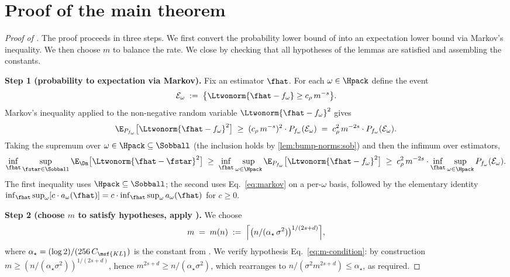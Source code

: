 \section{Proof of the main theorem}\label{sec:proof-of-thm}

\begin{proof}[Proof of ]
The proof proceeds in three steps. We first convert the probability lower bound of  into an expectation lower bound via Markov's inequality. We then choose $m$ to balance the rate. We close by checking that all hypotheses of the lemmas are satisfied and assembling the constants.

\smallskip\noindent\textbf{Step 1 (probability to expectation via Markov).}
Fix an estimator $\fhat$. For each $\omega \in \Hpack$ define the event
\begin{align*}
\mathcal{E}_\omega \;:=\; \bigl\{ \Ltwonorm{\fhat - f_\omega} \geq c_\rho \, m^{-s} \bigr\}.
\end{align*}
Markov's inequality applied to the non-negative random variable $\Ltwonorm{\fhat - f_\omega}^2$ gives
\begin{align}\label{eq:markov}
\E_{P_{f_\omega}}\bigl[ \Ltwonorm{\fhat - f_\omega}^2 \bigr]
\;\geq\; (c_\rho \, m^{-s})^2 \cdot P_{f_\omega}(\mathcal{E}_\omega)
\;=\; c_\rho^2 \, m^{-2s} \cdot P_{f_\omega}(\mathcal{E}_\omega).
\end{align}
Taking the supremum over $\omega \in \Hpack \subseteq \Sobball$ (the inclusion holds by \ref{lem:bump-norms:sob}) and then the infimum over estimators,
\begin{align}\label{eq:risk-to-prob}
\inf_{\fhat} \sup_{\fstar \in \Sobball} \E_{\Dn}\bigl[ \Ltwonorm{\fhat - \fstar}^2 \bigr]
\;\geq\;
\inf_{\fhat} \sup_{\omega \in \Hpack} \E_{P_{f_\omega}}\bigl[ \Ltwonorm{\fhat - f_\omega}^2 \bigr]
\;\geq\;
c_\rho^2 \, m^{-2s} \cdot \inf_{\fhat} \sup_{\omega \in \Hpack} P_{f_\omega}(\mathcal{E}_\omega).
\end{align}
The first inequality uses $\Hpack \subseteq \Sobball$; the second uses Eq.~\eqref{eq:markov} on a per-$\omega$ basis, followed by the elementary identity $\inf_{\fhat} \sup_\omega [c \cdot a_\omega(\fhat)] = c \cdot \inf_{\fhat} \sup_\omega a_\omega(\fhat)$ for $c \geq 0$.

\smallskip\noindent\textbf{Step 2 (choose $m$ to satisfy hypotheses, apply ).}
We choose
\begin{align}\label{eq:m-choice}
m \;=\; m(n) \;:=\; \Bigl\lceil \bigl( n / (\alpha_\star \, \sigma^2) \bigr)^{1/(2s + d)} \Bigr\rceil,
\end{align}
where $\alpha_\star = (\log 2) / (256 \, C_{\msf{KL}})$ is the constant from . We verify hypothesis Eq.~\eqref{eq:m-condition}: by construction $m \geq (n/(\alpha_\star \sigma^2))^{1/(2s+d)}$, hence $m^{2s + d} \geq n/(\alpha_\star \sigma^2)$, which rearranges to $n/(\sigma^2 m^{2s+d}) \leq \alpha_\star$, as required.


\end{proof}
